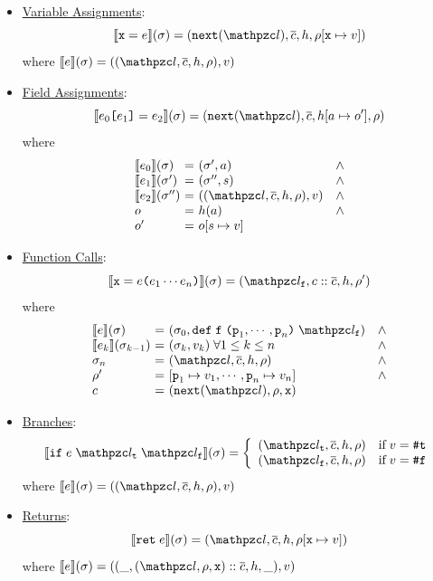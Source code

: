 \begin{itemize}
  \item \underline{Variable Assignments}:
    \[
      \sem{\varx = \expr}(\st) =
      (\getnext(\lab), \ctxts, \heap, \env[\varx \mapsto \val])
    \]
    where $\sem{\expr}(\st) = ((\lab, \ctxts, \heap, \env), \val)$

  \item \underline{Field Assignments}:
    \[
      \sem{\expr_0 \kwsl \expr_1 \kwsr = \expr_2}(\st) =
      (\getnext(\lab), \ctxts, \heap[\addr \mapsto \obj'], \env)
    \]
    where
    \[
      \begin{array}{l@{~}c@{~}ll}
        \sem{\expr_0}(\st) &=& (\st', \addr) &\wedge\\
        \sem{\expr_1}(\st') &=& (\st'', \str) &\wedge\\
        \sem{\expr_2}(\st'') &=& ((\lab, \ctxts, \heap, \env), \val) &\wedge\\
        \obj &=& \heap(\addr) &\wedge\\
        \obj' &=& \obj[\str \mapsto \val]\\
      \end{array}
    \]

  \item \underline{Function Calls}:
    \[
      \sem{\varx = \expr \kwrl \expr_1 \cdots \expr_n \kwrr}(\st) =
      (\lab_\varf, \ctxt :: \ctxts, \heap, \env')
    \]
    where
    \[
      \begin{array}{l@{~}c@{~}ll}
        \sem{\expr}(\st) &=& (\st_0, \kwdef \; \varf \; \kwrl \varp_1, \cdots,
        \varp_n \kwrr \; \lab_\varf) &\wedge\\
        \sem{\expr_k}(\st_{k-1}) &=& (\st_k, \val_k) \; \forall 1 \leq k \leq n
        &\wedge\\
        \st_n &=& (\lab, \ctxts, \heap, \env) &\wedge\\
        \env' &=& [\varp_1 \mapsto \val_1, \cdots, \varp_n \mapsto \val_n]
        &\wedge\\
        \ctxt &=& (\getnext(\lab), \env, \varx)\\
      \end{array}
    \]

  \item \underline{Branches}:
    \[
      \sem{\kwif \; \expr \; \lab_\vart \; \lab_\varf}(\st) =
      \left\{
        \begin{array}{ll}
          (\lab_\vart, \ctxts, \heap, \env) & \text{if} \; \val = \true\\
          (\lab_\varf, \ctxts, \heap, \env) & \text{if} \; \val = \false\\
        \end{array}
      \right.
    \]
    where $\sem{\expr}(\st) = ((\lab, \ctxts, \heap, \env), \val)$

  \item \underline{Returns}:
    \[
      \sem{\kwret \; \expr}(\st) = (\lab, \ctxts, \heap, \env[\varx \mapsto
      \val])
    \]
    where $\sem{\expr}(\st) = ((\_, (\lab, \env, \varx) :: \ctxts, \heap, \_),
    \val)$
\end{itemize}

